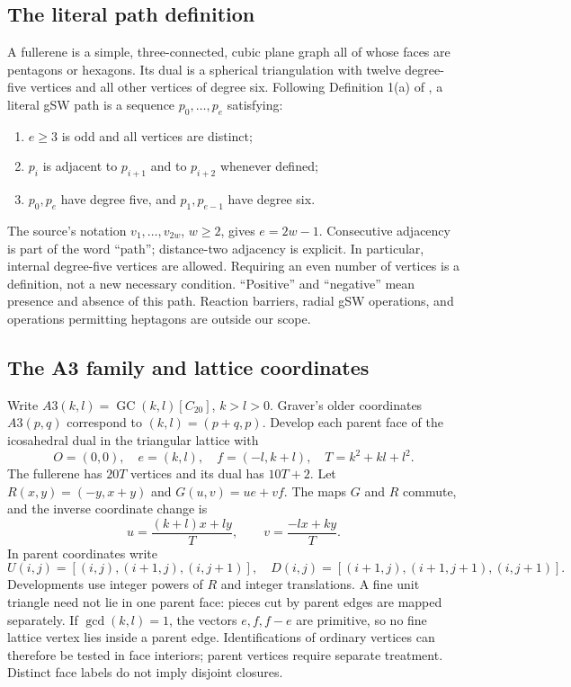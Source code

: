 \documentclass[11pt]{amsart}
\newcommand{\GC}{\operatorname{GC}}
\begin{document}
\subsection{The literal path definition}
A fullerene is a simple, three-connected, cubic plane graph all of whose
faces are pentagons or hexagons. Its dual is a spherical triangulation
with twelve degree-five vertices and all other vertices of degree six.
Following Definition 1(a) of \cite{BBS}, a literal gSW path is a sequence
$p_0,\ldots,p_e$ satisfying:
\begin{enumerate}
\item $e\ge3$ is odd and all vertices are distinct;
\item $p_i$ is adjacent to $p_{i+1}$ and to $p_{i+2}$ whenever defined;
\item $p_0,p_e$ have degree five, and $p_1,p_{e-1}$ have degree six.
\end{enumerate}
The source's notation $v_1,\ldots,v_{2w}$, $w\ge2$, gives $e=2w-1$.
Consecutive adjacency is part of the word ``path''; distance-two
adjacency is explicit. In particular, internal degree-five vertices
are allowed. Requiring an even number of vertices is a definition, not
a new necessary condition. ``Positive'' and ``negative'' mean presence
and absence of this path. Reaction barriers, radial gSW operations,
and operations permitting heptagons are outside our scope.

\subsection{The A3 family and lattice coordinates}
Write $A3(k,l)=\GC(k,l)[C_{20}]$, $k>l>0$. Graver's older coordinates
$A3(p,q)$ correspond to $(k,l)=(p+q,p)$. Develop each parent face of
the icosahedral dual in the triangular lattice with
\[
 O=(0,0),\quad e=(k,l),\quad f=(-l,k+l),\quad T=k^2+kl+l^2.
\]
The fullerene has $20T$ vertices and its dual has $10T+2$. Let
$R(x,y)=(-y,x+y)$ and $G(u,v)=ue+vf$. The maps $G$ and $R$ commute,
and the inverse coordinate change is
\begin{equation}\label{eq:1}
 u=\frac{(k+l)x+ly}{T},\qquad v=\frac{-lx+ky}{T}.\tag{1}
\end{equation}
In parent coordinates write
\[
 U(i,j)=[(i,j),(i+1,j),(i,j+1)],\quad
 D(i,j)=[(i+1,j),(i+1,j+1),(i,j+1)].
\]
Developments use integer powers of $R$ and integer translations. A fine
unit triangle need not lie in one parent face: pieces cut by parent
edges are mapped separately. If $\gcd(k,l)=1$, the vectors $e,f,f-e$
are primitive, so no fine lattice vertex lies inside a parent edge.
Identifications of ordinary vertices can therefore be tested in face
interiors; parent vertices require separate treatment. Distinct face
labels do not imply disjoint closures.
\end{document}
